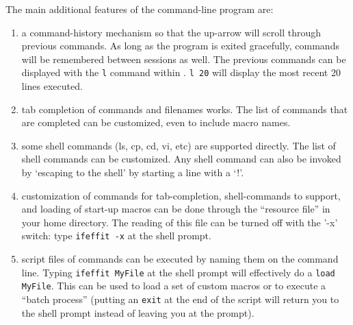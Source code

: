 The main additional features of the command-line program are:
\begin{enumerate}
\item a command-history mechanism so that the up-arrow will scroll through
  previous commands.  As long as the program is exited gracefully, commands
  will be remembered between {\ifeffit} sessions as well.  The previous
  commands can be displayed with the {\texttt{l}} command within
  {\ifeffit}.  {\texttt{l 20}} will display the most recent 20 lines
  executed.
  
\item tab completion of commands and filenames works.  The list of commands
  that are completed can be customized, even to include macro names.
  
\item some shell commands (ls, cp, cd, vi, etc) are supported directly.
  The list of shell commands can be customized.  Any shell command can also
  be invoked by `escaping to the shell' by starting a line with a `!'.
  
\item customization of commands for tab-completion, shell-commands to
  support, and loading of start-up macros can be done through the
  ``resource file'' {} in your home directory.  The
  reading of this file can be turned off with the '-x' switch: type
  {\texttt{ifeffit -x}} at the shell prompt.
  
\item script files of {\ifeffit} commands can be executed by naming them on
  the command line.  Typing {\texttt{ifeffit MyFile}} at the shell prompt
  will effectively do a {\texttt{load MyFile}}.  This can be used to load a
  set of custom macros or to execute a ``batch process'' (putting an
  {\texttt{exit}} at the end of the script will return you to the shell
  prompt instead of leaving you at the {\ifeffit} prompt).

\end{enumerate}

